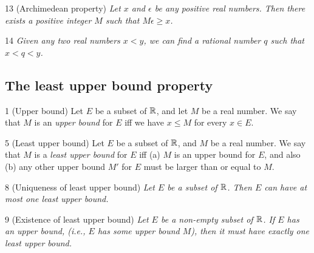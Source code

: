 \begin{corollary}{13}
    \label{archimedean}
    (Archimedean property) \emph{Let $x$ and $\epsilon$ be any positive
    real numbers. Then there exists a positive integer $M$ such that $M\epsilon \geq x$.}
\end{corollary}

\begin{proposition}{14}
    \label{rationals-dense}
    \emph{Given any two real numbers $x < y$, we can find a rational number $q$
    such that $x < q < y$.}
\end{proposition}

\subsection{The least upper bound property}
\begin{definition}{1}
    \label{upper-bound}
    (Upper bound) Let $E$ be a subset of $\mathbb{R}$, and let $M$ be a real number. We
    say that $M$ is an \emph{upper bound} for $E$ iff we have $x \leq M$ for every
    $x \in E$.
\end{definition}

\begin{definition}{5}
    \label{least-upper-bound}
    (Least upper bound) Let $E$ be a subset of $\mathbb{R}$, and $M$ be a real number.
    We say that $M$ is a \emph{least upper bound} for $E$ iff (a) $M$ is an upper
    bound for $E$, and also (b) any other upper bound $M'$ for $E$ must be larger
    than or equal to $M$.
\end{definition}

\begin{proposition}{8}
    \label{lub-unique}
    (Uniqueness of least upper bound) \emph{Let $E$ be a subset of $\mathbb{R}$. Then $E$
    can have at most one least upper bound.}
\end{proposition}

\begin{theorem}{9}
    \label{lub-exists}
    (Existence of least upper bound) \emph{Let $E$ be a non-empty subset of $\mathbb{R}$.
    If $E$ has an upper bound, (i.e., $E$ has some upper bound $M$), then it must
    have exactly one least upper bound.}
\end{theorem}

